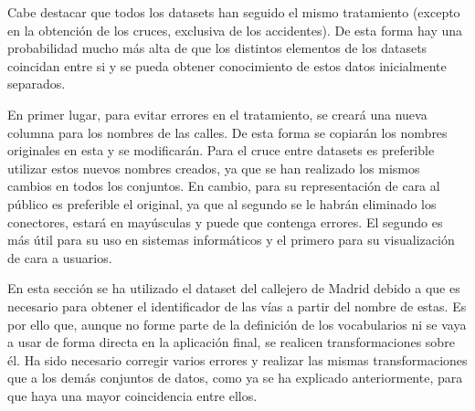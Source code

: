 Cabe destacar que todos los datasets han seguido el mismo tratamiento (excepto en la obtención de los cruces, exclusiva de los accidentes). De esta forma hay una probabilidad mucho más alta de que los distintos elementos de los datasets coincidan entre si y se pueda obtener conocimiento de estos datos inicialmente separados.

En primer lugar, para evitar errores en el tratamiento, se creará una nueva columna para los nombres de las calles. De esta forma se copiarán los nombres originales en esta y se modificarán. Para el cruce entre datasets es preferible utilizar estos nuevos nombres creados, ya que se han realizado los mismos cambios en todos los conjuntos. En cambio, para su representación de cara al público es preferible el original, ya que al segundo se le habrán eliminado los conectores, estará en mayúsculas y puede que contenga errores. El segundo es más útil para su uso en sistemas informáticos y el primero para su visualización de cara a usuarios.

En esta sección se ha utilizado el dataset del callejero de Madrid \cite{datosmadrid_callejero} debido a que es necesario para obtener el identificador de las vías a partir del nombre de estas. Es por ello que, aunque no forme parte de la definición de los vocabularios ni se vaya a usar de forma directa en la aplicación final, se realicen transformaciones sobre él. Ha sido necesario corregir varios errores y realizar las mismas transformaciones que a los demás conjuntos de datos, como ya se ha explicado anteriormente, para que haya una mayor coincidencia entre ellos.

